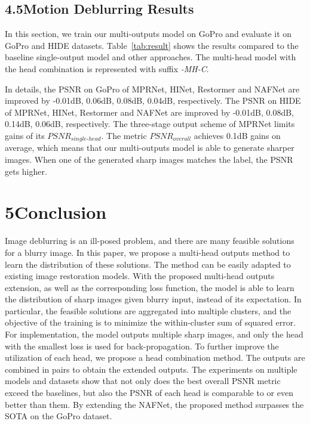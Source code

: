 \documentclass[letterpaper]{article} \usepackage{aaai23}  \usepackage{times}  \usepackage{helvet}  \usepackage{courier}  \usepackage[hyphens]{url}  \usepackage{graphicx} \urlstyle{rm} \def\UrlFont{\rm}  \usepackage{natbib}  \usepackage{caption} \frenchspacing  \setlength{\pdfpagewidth}{8.5in} \setlength{\pdfpageheight}{11in} \usepackage{algorithm}
\begin{document}
\subsection{4.5\quad Motion Deblurring Results}

In this section, we train our multi-outputs model on GoPro and evaluate it on GoPro and HIDE datasets. Table~\ref{tab:result} shows the results compared to the baseline single-output model and other approaches. The multi-head model with the head combination is represented with suffix \textit{-MH-C}. 

In details, the PSNR on GoPro of MPRNet, HINet, Restormer and NAFNet are improved by -0.01dB, 0.06dB, 0.08dB, 0.04dB, respectively. The PSNR on HIDE of MPRNet, HINet, Restormer and NAFNet are improved by -0.01dB, 0.08dB, 0.14dB, 0.06dB, respectively. The three-stage output scheme of MPRNet limits gains of its $P\!S\!N\!R_{single\mbox{-}head}$. The metric $P\!S\!N\!R_{overall}$ achieves 0.1dB gains on average, which means that our multi-outputs model is able to generate sharper images. When one of the generated sharp images matches the label, the PSNR gets higher.

\section{5\quad Conclusion}

Image deblurring is an ill-posed problem, and there are many feasible solutions for a blurry image. In this paper, we propose a multi-head outputs method to learn the distribution of these solutions. The method can be easily adapted to existing image restoration models. With the proposed multi-head outputs extension, as well as the corresponding loss function, the model is able to learn the distribution of sharp images given blurry input, instead of its expectation. In particular, the feasible solutions are aggregated into multiple clusters, and the objective of the training is to minimize the within-cluster sum of squared error. For implementation, the model outputs multiple sharp images, and only the head with the smallest loss is used for back-propagation. To further improve the utilization of each head, we propose a head combination method. The outputs are combined in pairs to obtain the extended outputs. The experiments on multiple models and datasets show that not only does the best overall PSNR metric exceed the baselines, but also the PSNR of each head is comparable to or even better than them. By extending the NAFNet, the proposed method surpasses the SOTA on the GoPro dataset.




\end{document}
